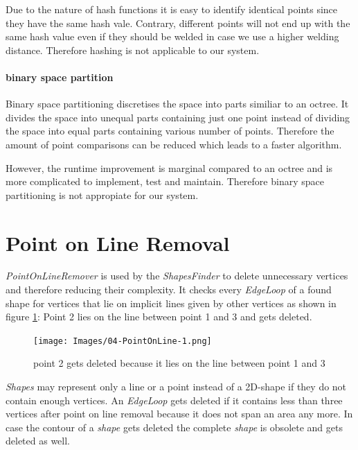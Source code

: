 \documentclass[../ClassicThesis.tex]{subfiles}
\begin{document}
Due to the nature of hash functions it is easy to identify identical points since they have the same hash vale. Contrary, different points will not end up with the same hash value even if they should be welded in case we use a higher welding distance. Therefore hashing is not applicable to our system.

\paragraph{binary space partition}

Binary space partitioning discretises the space into parts similiar to an octree. It divides the space into unequal parts containing just one point instead of dividing the space into equal parts containing various number of points. Therefore the amount of point comparisons can be reduced which leads to a faster algorithm.

However, the runtime improvement is marginal compared to an octree and is more complicated to implement, test and maintain. Therefore binary space partitioning is not appropiate for our system.





\section{Point on Line Removal}

\emph{PointOnLineRemover} is used by the \emph{ShapesFinder} to delete unnecessary vertices and therefore reducing their complexity. It checks every \emph{EdgeLoop} of a found shape for vertices that lie on implicit lines given by other vertices as shown in figure \ref{fig:pointOnLine1}: Point 2 lies on the line between point 1 and 3 and gets deleted.

\begin{figure}
    \texttt{[image: Images/04-PointOnLine-1.png]}
    \caption{point 2 gets deleted because it lies on the line between point 1 and 3}
    \label{fig:pointOnLine1}
\end{figure}

\emph{Shapes} may represent only a line or a point instead of a 2D-shape if they do not contain enough vertices. An \emph{EdgeLoop} gets deleted if it contains less than three vertices after point on line removal because it does not span an area any more. In case the contour of a \emph{shape} gets deleted the complete \emph{shape} is obsolete and gets deleted as well.
\end{document}
